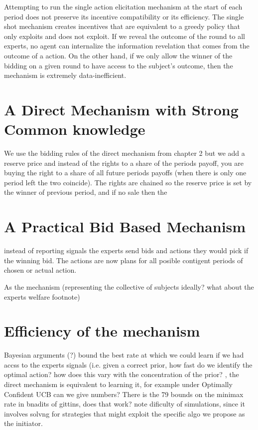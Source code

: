 Attempting to run the single action elicitation mechanism at the start of each period does not preserve its incentive compatibility or its efficiency.
The single shot mechanism creates incentives that are equivalent to a greedy policy that only exploits and does not exploit. If we reveal the outcome of the round to all experts,  no agent can internalize the information revelation that comes from the outcome of a action. On the other hand, if we only allow the winner of the bidding on a given round to have access to the subject's outcome, then the mechanism is extremely data-inefficient.

\section{A Direct Mechanism with Strong Common knowledge}

We use the bidding rules of the direct mechanism from chapter 2 but we add a reserve price and instead of the rights to a share of the periods payoff, you are buying the right to a share of all future periods payoffs (when there is only one period left the two coincide). The rights are chained so the reserve price is set by the winner of previous period, and if no sale then the 

\section{A Practical Bid Based Mechanism}

instead of reporting signals the experts send bids and actions they would pick if the winning bid. The actions are now plans for all posible contigent periods of chosen or actual action. 

As the mechanism (representing the collective of subjects ideally?  what about the experts welfare footnote) 




\section{Efficiency of the mechanism}



Bayesian arguments  (?)  bound the best rate at which we could learn if we had accss to the experts signals (i.e. given a correct prior, how fast do we identify the optimal action? how does this vary with the concentration of the prior? , the direct mechanism is equivalent to learning it, for example under Optimally Confident UCB can we give numbers? There is the 79 bounds on the minimax rate in bnadits of gittins, does that work? note dificulty of simulations, since it involves solvng for strategies that might exploit the specific algo we propose as the initiator.

